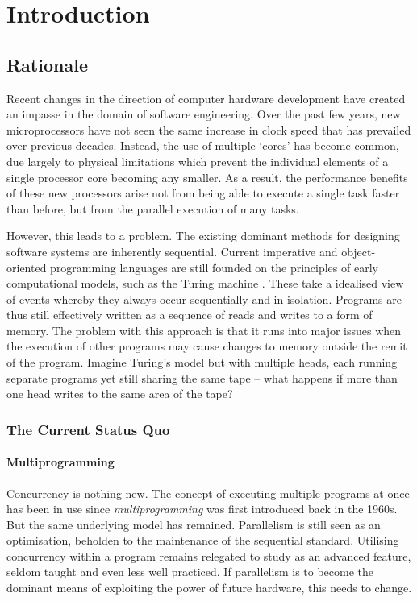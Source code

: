 \chapter{Introduction}
\label{introduction}

\section{Rationale}

Recent changes in the direction of computer hardware development have
created an impasse in the domain of software engineering.  Over the
past few years, new microprocessors have not seen the same increase in
clock speed that has prevailed over previous decades.  Instead, the
use of multiple `cores' has become common, due largely to physical
limitations which prevent the individual elements of a single
processor core becoming any smaller.  As a result, the performance
benefits of these new processors arise not from being able to execute
a single task faster than before, but from the parallel execution of
many tasks.

However, this leads to a problem.  The existing dominant methods for
designing software systems are inherently sequential.  Current
imperative and object-oriented programming languages are still founded
on the principles of early computational models, such as the Turing
machine \cite{turing:36}.  These take a idealised view of events
whereby they always occur sequentially and in isolation.  Programs are
thus still effectively written as a sequence of reads and writes to a
form of memory.  The problem with this approach is that it runs into
major issues when the execution of other programs may cause changes to
memory outside the remit of the program.  Imagine Turing's model but
with multiple heads, each running separate programs yet still sharing
the same tape -- what happens if more than one head writes to the same
area of the tape?

\subsection{The Current Status Quo}

\subsubsection{Multiprogramming}

Concurrency is nothing new.  The concept of executing multiple
programs at once has been in use since \emph{multiprogramming} was
first introduced back in the 1960s.  But the same underlying model has
remained.  Parallelism is still seen as an optimisation, beholden to
the maintenance of the sequential standard.  Utilising concurrency
within a program remains relegated to study as an advanced feature,
seldom taught and even less well practiced.  If parallelism is to
become the dominant means of exploiting the power of future hardware,
this needs to change.

